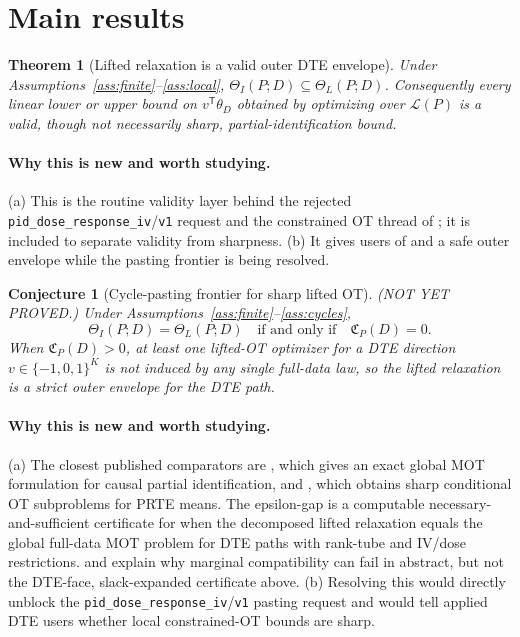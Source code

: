 \documentclass[11pt]{article}
\newcommand{\transpose}{\mathsf{T}}
\theoremstyle{definition}
\theoremstyle{plain}
\newtheorem{theorem}{Theorem}
\newtheorem{conjecture}{Conjecture}
\theoremstyle{remark}
\begin{document}
\section{Main results}
\begin{theorem}[Lifted relaxation is a valid outer DTE envelope]\label{thm:outer}
Under Assumptions~\ref{ass:finite}--\ref{ass:local},
\(\Theta_I(P;D)\subseteq\Theta_L(P;D)\).  Consequently every linear lower or
upper bound on \(v^\transpose\theta_D\) obtained by optimizing over
\(\mathcal L(P)\) is a valid, though not necessarily sharp, partial-identification
bound.
\end{theorem}

\paragraph{Why this is new and worth studying.}
(a) This is the routine validity layer behind the rejected
\texttt{pid\_dose\_response\_iv}/\texttt{v1} request and the constrained OT
thread of \citet{TanBlanchetSyrgkanis2026}; it is included to separate validity
from sharpness.  (b) It gives users of \citet{Russell2021} and
\citet{OberReynolds2023} a safe outer envelope while the pasting frontier is
being resolved.

\begin{conjecture}[Cycle-pasting frontier for sharp lifted OT]\label{conj:cycle-frontier}
(NOT YET PROVED.)  Under Assumptions~\ref{ass:finite}--\ref{ass:cycles},
\[
\Theta_I(P;D)=\Theta_L(P;D)
\quad\text{if and only if}\quad
\mathfrak C_P(D)=0.
\]
When \(\mathfrak C_P(D)>0\), at least one lifted-OT optimizer for a DTE direction
\(v\in\{-1,0,1\}^K\) is not induced by any single full-data law, so the lifted
relaxation is a strict outer envelope for the DTE path.
\end{conjecture}

\paragraph{Why this is new and worth studying.}
(a) The closest published comparators are \citet[Section 2]{GaoGeQian2025},
which gives an exact global MOT formulation for causal partial identification,
and \citet[Sections 2--3]{TanBlanchetSyrgkanis2026}, which obtains sharp
conditional OT subproblems for PRTE means.  The epsilon-gap is a computable
necessary-and-sufficient certificate for when the decomposed lifted relaxation
equals the global full-data MOT problem for DTE paths with rank-tube and IV/dose
restrictions.  \citet[Section 2]{Vorobev1962} and
\citet[Chapter 3]{Kellerer1984} explain why marginal compatibility can fail in
abstract, but not the DTE-face, slack-expanded certificate above.  (b)
Resolving this would directly unblock the
\texttt{pid\_dose\_response\_iv}/\texttt{v1} pasting request and would tell
applied DTE users whether local constrained-OT bounds are sharp.
\end{document}
